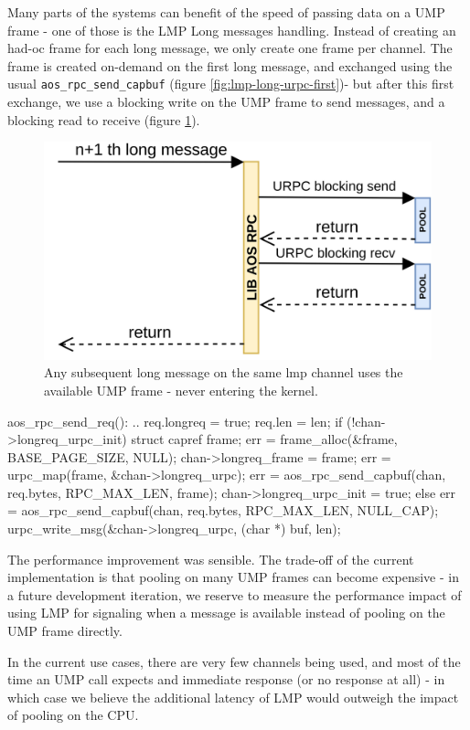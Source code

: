 \documentclass[a4paper,twoside,openright]{report}
\begin{document}
Many parts of the systems can benefit of the speed of passing data on a UMP frame - one of those is the LMP Long messages handling.
Instead of creating an had-oc frame for each long message, we only create one frame per channel. The frame is created on-demand on the first long message, and exchanged using the usual \texttt{aos\_rpc\_send\_capbuf} (figure \ref{fig:lmp-long-urpc-first})- but after this first exchange, we use a blocking write on the UMP frame to send messages, and a blocking read to receive (figure \ref{fig:lmp-long-urpc}).

\begin{figure}[ht]
	\centering
	\includegraphics[width=0.7\linewidth]{assets/lmp-long-urpc}
	\caption{Any subsequent long message on the same lmp channel uses the available UMP frame - never entering the kernel.}
	\label{fig:lmp-long-urpc}
\end{figure}

\begin{pandacode}
aos_rpc_send_req(): ..
req.longreq = true; req.len = len;
if (!chan->longreq_urpc_init) 
	struct capref frame;
	err = frame_alloc(&frame, BASE_PAGE_SIZE, NULL);
	chan->longreq_frame = frame;	
	err = urpc_map(frame, &chan->longreq_urpc);
	err = aos_rpc_send_capbuf(chan, req.bytes, RPC_MAX_LEN, frame);
	chan->longreq_urpc_init = true;
else
	err = aos_rpc_send_capbuf(chan, req.bytes, RPC_MAX_LEN, NULL_CAP);
urpc_write_msg(&chan->longreq_urpc, (char *) buf, len);
\end{pandacode}

The performance improvement was sensible. The trade-off of the current implementation is that pooling on many UMP frames can become expensive - in a future development iteration, we reserve to measure the performance impact of using LMP for signaling when a message is available instead of pooling on the UMP frame directly.

In the current use cases, there are very few channels being used, and most of the time an UMP call expects and immediate response (or no response at all) - in which case we believe the additional latency of LMP would outweigh the impact of pooling on the CPU.
\end{document}
